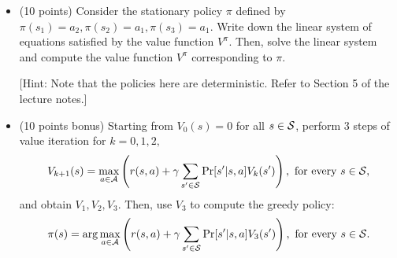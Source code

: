 \documentclass[11pt]{article}
\begin{document}
\begin{itemize}
    \item (10 points) Consider the stationary policy $\pi$ defined by $\pi(s_1)=a_2, \pi(s_2)=a_1,\pi(s_3)=a_1.$
    Write down the linear system of equations satisfied by the value function $V^{\pi}$.
    Then, solve the linear system and compute the value function $V^\pi$ corresponding to $\pi$.
    
    [Hint: Note that the policies here are deterministic. Refer to Section 5 of the lecture notes.]
    
    \item (10 points bonus) Starting from $V_0(s)=0$ for all $s \in \mathcal{S}$, perform $3$ steps of value iteration for $k = 0, 1, 2,$
    \[ V_{k+1}(s)=\max_{a\in\mathcal{A}}\left(r(s,a)+\gamma\sum_{s'\in\mathcal{S}}\Pr[s'|s,a] V_k(s')\right), \text{ for every } s \in \mathcal{S}, \]
    and obtain $V_1, V_2, V_3$. Then, use $V_3$ to compute the greedy policy:
    \[ \pi(s) = \arg\max_{a\in\mathcal{A}}\left(r(s,a)+\gamma\sum_{s'\in\mathcal{S}} \Pr[s'|s,a] V_3(s')\right), \text{ for every } s \in \mathcal{S}. \]
\end{itemize}
\end{document}
